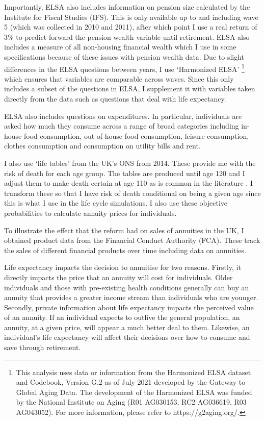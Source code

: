 \documentclass[12pt]{article}
\begin{document}
Importantly, ELSA also includes information on pension size calculated by the
Institute for Fiscal Studies (IFS). This is only available up to and including
wave 5 (which was collected in 2010 and 2011), after which point I use a real return
of 3\% to predict forward the pension wealth variable until retirement. ELSA
also includes a measure of all non-housing financial wealth which I use in some
specifications because of these issues with pension wealth data. Due to slight
differences in the ELSA questions between years, I use `Harmonized ELSA'
\footnote{This analysis uses data or information from the Harmonized ELSA
    dataset and Codebook, Version G.2 as of July 2021 developed by the Gateway to
    Global Aging Data. The development of the Harmonized ELSA was funded by the
    National Institute on Aging (R01 AG030153, RC2 AG036619, R03 AG043052). For more
    information, please refer to https://g2aging.org/.} which ensures that variables
are comparable across waves. Since this only includes a subset of the questions
in ELSA, I supplement it with variables taken directly from the data such as
questions that deal with life expectancy.

ELSA also includes questions on expenditures. In particular, individuals are
asked how much they consume across a range of broad categories including
in-house food consumption, out-of-house food consumption, leisure consumption,
clothes consumption and consumption on utility bills and rent.

I also use `life tables' from the UK's ONS from 2014. These provide me with the
risk of death for each age group. The tables are produced until age 120 and I
adjust them to make death certain at age 110 as is common in the literature
\citep{odea_sturrock_rest_2023}. I transform these so that I have risk of death
conditional on being a given age since this is what I use in the life cycle
simulations. I also use these objective probabilities to calculate annuity
prices for individuals.

To illustrate the effect that the reform had on sales of annuities in the UK, I
obtained product data from the Financial Conduct Authority (FCA). These track the
sales of different financial products over time including data on annuities.

Life expectancy impacts the decision to annuitise for two reasons. Firstly, it
directly impacts the price that an annuity will cost for individuals. Older
individuals and those with pre-existing health conditions generally can buy an
annuity that provides a greater income stream than individuals who are younger.
Secondly, private information about life expectancy impacts the perceived value
of an annuity. If an individual expects to outlive the general population, an
annuity, at a given price, will appear a much better deal to them. Likewise, an
individual's life expectancy will affect their decisions over how to consume and
save through retirement.
\end{document}
